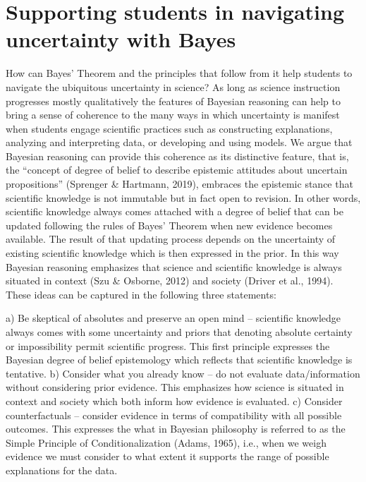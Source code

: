 \section{Supporting students in navigating uncertainty with Bayes}

How can Bayes’ Theorem and the principles that follow from it help students to navigate the ubiquitous uncertainty in science? As long as science instruction progresses mostly qualitatively the features of Bayesian reasoning can help to bring a sense of coherence to the many ways in which uncertainty is manifest when students engage scientific practices such as constructing explanations, analyzing and interpreting data, or developing and using models. We argue that Bayesian reasoning can provide this coherence as its distinctive feature, that is, the “concept of degree of belief to describe epistemic attitudes about uncertain propositions” (Sprenger & Hartmann, 2019), embraces the epistemic stance that scientific knowledge is not immutable but in fact open to revision. In other words, scientific knowledge always comes attached with a degree of belief that can be updated following the rules of Bayes’ Theorem when new evidence becomes available. The result of that updating process depends on the uncertainty of existing scientific knowledge which is then expressed in the prior. In this way Bayesian reasoning emphasizes that science and scientific knowledge is always situated in context (Szu & Osborne, 2012) and society (Driver et al., 1994). These ideas can be captured in the following three statements:
 
a) Be skeptical of absolutes and preserve an open mind – scientific knowledge always comes with some uncertainty and priors that denoting absolute certainty or impossibility permit scientific progress. This first principle expresses the Bayesian degree of belief epistemology which reflects that scientific knowledge is tentative. 
b) Consider what you already know – do not evaluate data/information without considering prior evidence. This emphasizes how science is situated in context and society which both inform how evidence is evaluated.
c) Consider counterfactuals – consider evidence in terms of compatibility with all possible outcomes. This expresses the what in Bayesian philosophy is referred to as the Simple Principle of Conditionalization (Adams, 1965), i.e., when we weigh evidence we must consider to what extent it supports the range of possible explanations for the data. 

